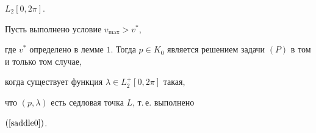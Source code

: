$L_{2}[0,2\pi]$.





\begin{thm}


Пусть выполнено условие $v_{\max}>v^{*}$,


где $v^{*}$ определено в лемме $1$. Тогда $p \in


K_{0}$ является решением задачи $(P)$ в том и только том случае,


когда существует функция $\lambda \in L_{2}^{+}[0,2\pi]$ такая,


что $(p,\lambda)$ есть седловая точка $L$, т.\,е. выполнено


$(\ref{saddle0})$.


\end{thm}






